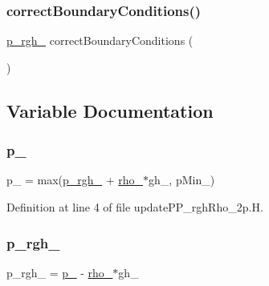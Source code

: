 \subsubsection{\texorpdfstring{correct\+Boundary\+Conditions()}{correctBoundaryConditions()}}
{\footnotesize\ttfamily \hyperlink{updatePP__rghRho__2p_8H_a320090d1a3c1675778a59e981765c77c}{p\+\_\+rgh\+\_\+} correct\+Boundary\+Conditions (\begin{DoxyParamCaption}{ }\end{DoxyParamCaption})}



\subsection{Variable Documentation}
\mbox{\label{updatePP__rghRho__2p_8H_a0ab83dbbf86dba470a7696e1609d523c}} 
\subsubsection{\texorpdfstring{p\+\_\+}{p\_}}
{\footnotesize\ttfamily p\+\_\+ = max(\hyperlink{updatePP__rghRho__2p_8H_a320090d1a3c1675778a59e981765c77c}{p\+\_\+rgh\+\_\+} + \hyperlink{updatePP__rghRho__2p_8H_ad9bea30ee8a23ee1c8b9d638756b1588}{rho\+\_\+}$\ast$gh\+\_\+, p\+Min\+\_\+)}



Definition at line 4 of file update\+P\+P\+\_\+rgh\+Rho\+\_\+2p.\+H.

\mbox{\label{updatePP__rghRho__2p_8H_a320090d1a3c1675778a59e981765c77c}} 
\subsubsection{\texorpdfstring{p\+\_\+rgh\+\_\+}{p\_rgh\_}}
{\footnotesize\ttfamily p\+\_\+rgh\+\_\+ = \hyperlink{updatePP__rghRho__2p_8H_a0ab83dbbf86dba470a7696e1609d523c}{p\+\_\+} -\/ \hyperlink{updatePP__rghRho__2p_8H_ad9bea30ee8a23ee1c8b9d638756b1588}{rho\+\_\+}$\ast$gh\+\_\+}




